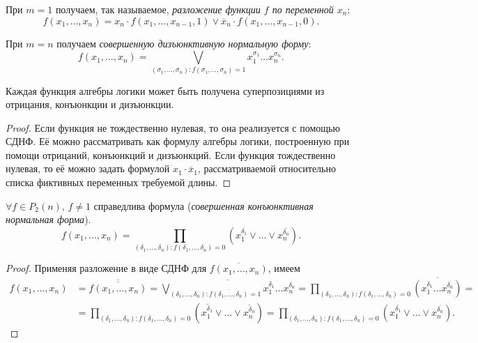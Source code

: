 \begin{corollary}
    При $m = 1$ получаем, так называемое, \textit{разложение функции $f$ по переменной $x_n$}:
    \[f(x_1, \ldots, x_n) = x_n \cdot f(x_1, \ldots, x_{n - 1}, 1) \vee \overline{x}_n \cdot f(x_1, \ldots, x_{n - 1}, 0).\]
\end{corollary}

\begin{corollary}
    При $m = n$ получаем \textit{совершенную дизъюнктивную нормальную форму}:
    \[f(x_1, \ldots, x_n) = \bigvee\limits_{(\sigma_1, \ldots, \sigma_n): f(\sigma_1, \ldots, \sigma_n) = 1}x_1^{\sigma_1}\ldots x_n^{\sigma_n}.\]
\end{corollary}

\begin{theorem}
    Каждая функция алгебры логики может быть получена суперпозициями из отрицания, конъюнкции и дизъюнкции.
\end{theorem}

\begin{proof}
    Если функция не тождественно нулевая, то она реализуется с помощью СДНФ. Её можно рассматривать как формулу алгебры логики, построенную при помощи отрицаний, конъюнкций и дизъюнкций. Если функция тождественно нулевая, то её можно задать формулой $x_1 \cdot \overline{x}_1$, рассматриваемой относительно списка фиктивных переменных требуемой длины.
\end{proof}

\begin{theorem}
    $\forall f \in P_2(n)$, $f\neq 1$ справедлива формула (\textit{совершенная конъюнктивная нормальная форма}).
    \[
    f(x_1, \ldots, x_n) = \prod_{(\delta_1, \ldots, \delta_n): f(\delta_1, \ldots, \delta_n) = 0}(x_1^{\overline{\delta_1}} \vee \ldots\vee x_n^{\overline{\delta_n}}).
\]
\end{theorem}

\begin{proof}
    Применяя разложение в виде СДНФ для $\overline{f(x_1, \ldots, x_n)}$, имеем
    \begin{equation*}
        \begin{split}
        f(x_1, \ldots, x_n) &= \overline{\overline{f(x_1, \ldots, x_n)}} = \overline{\bigvee\limits_{(\delta_1, \ldots, \delta_n): \overline{f(\delta_1, \ldots, \delta_n)} = 1}x_1^{\delta_1}\ldots x_n^{\delta_n}} = \prod_{(\delta_1, \ldots, \delta_n): f(\delta_1, \ldots, \delta_n) = 0}\overline{(x_1^{\delta_1}\ldots x_n^{\delta_n})} = \\
        &= \prod_{(\delta_1, \ldots, \delta_n): f(\delta_1, \ldots, \delta_n) = 0}(\overline{x_1^{\delta_1}} \vee \ldots\vee \overline{x_n^{\delta_n}}) = \prod_{(\delta_1, \ldots, \delta_n): f(\delta_1, \ldots, \delta_n) = 0}(x_1^{\overline{\delta_1}} \vee \ldots\vee x_n^{\overline{\delta_n}}).
        \end{split}
    \end{equation*}
\end{proof}